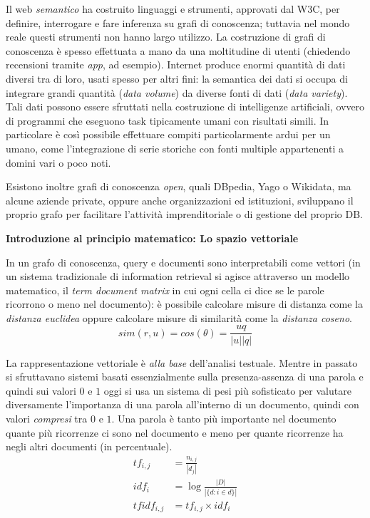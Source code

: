\documentclass[11pt]{article}
\begin{document}
Il web \textit{semantico} ha costruito linguaggi e strumenti, approvati dal W3C, per definire, interrogare e fare inferenza su grafi di conoscenza; tuttavia nel mondo reale questi strumenti non hanno largo utilizzo.
La costruzione di grafi di conoscenza è spesso effettuata a mano da una moltitudine di utenti (chiedendo recensioni tramite \textit{app}, ad esempio).
Internet produce enormi quantità di dati diversi tra di loro, usati spesso per altri fini: la semantica dei dati si occupa di integrare grandi quantità (\textit{data volume}) da diverse fonti di dati (\textit{data variety}).
Tali dati possono essere sfruttati nella costruzione di intelligenze artificiali, ovvero di programmi che eseguono task tipicamente umani con risultati simili.
In particolare è così possibile effettuare compiti particolarmente ardui per un umano, come l'integrazione di serie storiche con fonti multiple appartenenti a domini vari o poco noti.

Esistono inoltre grafi di conoscenza \textit{open}, quali DBpedia, Yago o Wikidata, ma alcune aziende private, oppure anche organizzazioni ed istituzioni, sviluppano il proprio grafo per facilitare l'attività imprenditoriale o di gestione del proprio DB.
\newline

\begin{itshape}
\textbf{Introduzione al principio matematico: Lo spazio vettoriale}
\end{itshape}

In un grafo di conoscenza, query e documenti sono interpretabili come vettori (in un sistema tradizionale di information retrieval si agisce attraverso un modello matematico, il \textit{term document matrix} in cui ogni cella ci dice se le parole ricorrono o meno nel documento): è possibile calcolare misure di distanza come la \textit{distanza euclidea} oppure calcolare misure di similarità come la \textit{distanza coseno}.
\begin{equation*}
  sim(r, u) = cos(\theta)= \frac{u q}{|u| |q|}
\end{equation*}

La rappresentazione vettoriale è \textit{alla base} dell'analisi testuale.
Mentre in passato si sfruttavano sistemi basati essenzialmente sulla presenza-assenza di una parola e quindi sui valori $0$ e $1$ oggi si usa un sistema di pesi più sofisticato per valutare diversamente l'importanza di una parola all'interno di un documento, quindi con valori \textit{compresi} tra $0$ e $1$.
Una parola è tanto più importante nel documento quante più ricorrenze ci sono nel documento e meno per quante ricorrenze ha negli altri documenti (in percentuale).
\begin{align*}
  tf_{i, j} &= \frac{n_{i,j}}{|d_j|} \\
  idf_i &= \log{\frac{|D|}{|\{d : i \in d\}|}} \\
  tfidf_{i, j} &= tf_{i, j} \times idf_i
\end{align*} 
\end{document}
